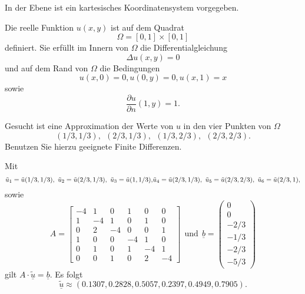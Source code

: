 In der Ebene ist ein kartesisches Koordinatensystem vorgegeben.

Die reelle Funktion $u(x,y)$ ist auf dem Quadrat
\[
\Omega = [0,1] \times [0,1]
\]
definiert. Sie erfüllt im Innern von $\Omega$ die Differentialgleichung
\[
\Delta u(x,y) = 0
\]
und auf dem Rand von $\Omega$ die Bedingungen
\[
u(x,0) = 0, u(0,y) = 0, u(x,1) = x
\]
sowie
\[
\frac{\partial u}{\partial n}(1,y) = 1.
\]

Gesucht ist eine Approximation der Werte von $u$ in den vier Punkten von
$\Omega$
\[
(1/3,1/3), \ \  (2/3,1/3), \ \ (1/3,2/3), \ \ (2/3,2/3).
\]
Benutzen Sie hierzu geeignete Finite Differenzen.


\begin{loesung}
Mit
\[
\tilde u_1 = \tilde u(1/3,1/3), \ \tilde u_2 = \tilde u(2/3,1/3), \ \tilde u_3 = \tilde u(1,1/3),$$ $$\tilde u_4 = \tilde u(2/3,1/3), \ \tilde u_5 = \tilde u(2/3,2/3), \ \tilde u_6 = \tilde u(2/3,1),
\]
sowie
\[
A = \left[\begin{array}{rrrrrr} 
-4 & 1 & 0 & 1 & 0 & 0\\
1 & -4 & 1 & 0 & 1 & 0 \\
0 & 2 & -4 & 0 & 0 & 1 \\ 

1 & 0 & 0 & -4 & 1 & 0 \\
0 & 1 & 0 & 1 & -4 & 1 \\
0 & 0 & 1 & 0 & 2 & -4 \end{array}\right] \ \ \mbox{und} \ \
\underline{b} =  \left(\begin{array}{r} 0 \\ 0 \\ -2/3 \\ -1/3 \\ -2/3 \\ -5/3 \end{array}\right)
\]
gilt $A \cdot \underline{\tilde u} = \underline{b}.$ Es folgt
\[
\underline{\tilde u} \approx (0.1307, 0.2828, 0.5057, 0.2397, 0.4949, 0.7905).
\]
\end{loesung}

